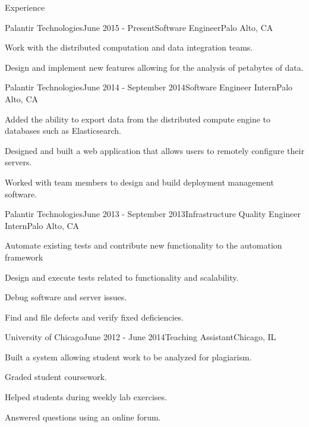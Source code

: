 \documentclass{resume} %
\begin{document}
\begin{rSection}{Experience}

\begin{rSubsection}{Palantir Technologies}{June 2015 - Present}{Software Engineer}{Palo Alto, CA}
\item Work with the distributed computation and data integration teams.
\item Design and implement new features allowing for the analysis of petabytes of data.
\end{rSubsection}


\begin{rSubsection}{Palantir Technologies}{June 2014 - September 2014}{Software Engineer Intern}{Palo Alto, CA}
\item Added the ability to export data from the distributed compute engine to databases such as Elasticsearch.
\item Designed and built a web application that allows users to remotely configure their servers.
\item Worked with team members to design and build deployment management software.
\end{rSubsection}


\begin{rSubsection}{Palantir Technologies}{June 2013 - September 2013}{Infrastructure Quality Engineer Intern}{Palo Alto, CA}
\item Automate existing tests and contribute new functionality to the automation framework
\item Design and execute tests related to functionality and scalability.
\item Debug software and server issues.
\item Find and file defects and verify fixed deficiencies.
\end{rSubsection}

\begin{rSubsection}{University of Chicago}{June 2012 - June 2014}{Teaching Assistant}{Chicago, IL}
\item Built a system allowing student work to be analyzed for plagiarism.
\item Graded student coursework.
\item Helped students during weekly lab exercises.
\item Answered questions using an online forum.
\end{rSubsection}


\end{rSection}
\end{document}

